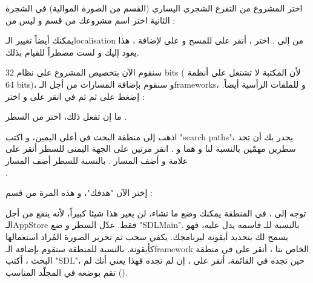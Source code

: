 
اختر المشروع من التفرع الشجري اليساري (القسم
من الصورة الموالية) في الشجرة الثانية اختر اسم مشروعك من قسم 
و ليس من
 :


يمكنك أيضاً تغيير الـ\textenglish{localisation}
من 
إلى 
.
اختر 
،
أنقر على
\InlineCode{-}
للمسح و على 
\InlineCode{+}
لإضافة 
،
هذا يعود إليك و لست مضطراً للقيام بذلك.

سنقوم الآن بتخصيص المشروع على نظام
\textenglish{32 bits}
( لأن المكتبة لا تشتغل على أنظمة
\textenglish{64 bits})،
و سنقوم بإضافة المسارات من أجل الـ\textenglish{frameworks}،
و للملفات الرأسية أيضاً. إضغط على 
ثم 
ثم في 
انقر على
 و اختر
 :


ما إن تفعل ذلك، اختر
من السطر
.


اذهب إلى منطقة البحث في أعلى اليمين، و اكتب
"\textenglish{search paths}"،
يجدر بك أن تجد سطرين مهمّين بالنسبة لنا و هما
و 
.
انقر مرتين على الجهة اليمنى للسطر 
أنقر على علامة
\InlineCode{+}
 و أضف المسار
.
بالنسبة للسطر 
أضف المسار\\
.


إختر الآن "هدفك"، و هذه المرة من قسم 
 :


توجه إلى 
،
في المنطقة
يمكنك وضع ما تشاء، لن يغير هذا شيئا كبيراً، لأنه ينفع من أجل الـ\textenglish{AppStore}
فقط. عدّل السطر 
و ضع 
"\textenglish{SDLMain}".
بالنسبة للـ
فاسمه يدل عليه، فهو يسمح لك بتحديد أيقونة لبرنامجك. يكفي سحب ثم تحرير الصورة المُراد استعمالها كأيقونة. بالنسبة للمنطقة 
سنقوم بإضافة الـ\textenglish{framework}
الخاص بنا
،
أنقر على
\InlineCode{+}
في منطقة البحث ، أكتب 
"\textenglish{SDL}"،
حين تجده في القائمة، أنقر على 
،
إن لم تجده فهذا يعني أنك لم تقم بوضعه في المجلّد المناسب 
().


